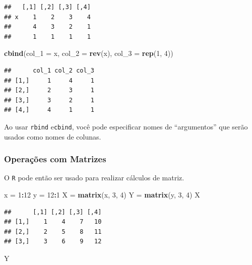 \documentclass[
]{book}
\newenvironment{Shaded}{\begin{snugshade}}{\end{snugshade}}
\newcommand{\DataTypeTok}[1]{\textcolor[rgb]{0.13,0.29,0.53}{#1}}
\newcommand{\DecValTok}[1]{\textcolor[rgb]{0.00,0.00,0.81}{#1}}
\newcommand{\KeywordTok}[1]{\textcolor[rgb]{0.13,0.29,0.53}{\textbf{#1}}}
\newcommand{\NormalTok}[1]{#1}
\newcommand{\OperatorTok}[1]{\textcolor[rgb]{0.81,0.36,0.00}{\textbf{#1}}}
\newcommand{\StringTok}[1]{\textcolor[rgb]{0.31,0.60,0.02}{#1}}
\theoremstyle{definition}
\theoremstyle{definition}
\theoremstyle{definition}
\theoremstyle{remark}
\begin{document}
\begin{verbatim}
##   [,1] [,2] [,3] [,4]
## x    1    2    3    4
##      4    3    2    1
##      1    1    1    1
\end{verbatim}

\begin{Shaded}
\begin{Highlighting}[]
\KeywordTok{cbind}\NormalTok{(}\DataTypeTok{col_1 =}\NormalTok{ x, }\DataTypeTok{col_2 =} \KeywordTok{rev}\NormalTok{(x), }\DataTypeTok{col_3 =} \KeywordTok{rep}\NormalTok{(}\DecValTok{1}\NormalTok{, }\DecValTok{4}\NormalTok{))}
\end{Highlighting}
\end{Shaded}

\begin{verbatim}
##      col_1 col_2 col_3
## [1,]     1     4     1
## [2,]     2     3     1
## [3,]     3     2     1
## [4,]     4     1     1
\end{verbatim}

Ao usar \texttt{rbind} e\texttt{cbind}, você pode especificar nomes de ``argumentos'' que serão usados como nomes de colunas.

\hypertarget{operauxe7uxf5es-com-matrizes}{%
\subsubsection{Operações com Matrizes}\label{operauxe7uxf5es-com-matrizes}}

O \texttt{R} pode então ser usado para realizar cálculos de matriz.

\begin{Shaded}
\begin{Highlighting}[]
\NormalTok{x =}\StringTok{ }\DecValTok{1}\OperatorTok{:}\DecValTok{12}
\NormalTok{y =}\StringTok{ }\DecValTok{12}\OperatorTok{:}\DecValTok{1}
\NormalTok{X =}\StringTok{ }\KeywordTok{matrix}\NormalTok{(x, }\DecValTok{3}\NormalTok{, }\DecValTok{4}\NormalTok{)}
\NormalTok{Y =}\StringTok{ }\KeywordTok{matrix}\NormalTok{(y, }\DecValTok{3}\NormalTok{, }\DecValTok{4}\NormalTok{)}
\NormalTok{X}
\end{Highlighting}
\end{Shaded}

\begin{verbatim}
##      [,1] [,2] [,3] [,4]
## [1,]    1    4    7   10
## [2,]    2    5    8   11
## [3,]    3    6    9   12
\end{verbatim}

\begin{Shaded}
\begin{Highlighting}[]
\NormalTok{Y}
\end{Highlighting}
\end{Shaded}
\end{document}
